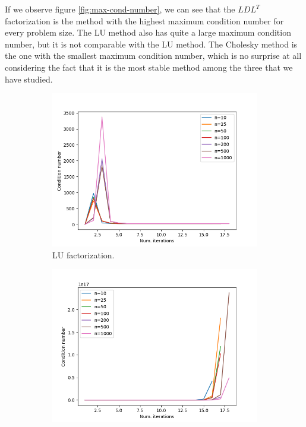 \documentclass[11pt,a4paper]{article}
\begin{document}
If we observe figure \ref{fig:max-cond-number}, we can see that the $LDL^T$ factorization
is the method with the highest maximum condition number for every problem size. The LU method
also has quite a large maximum condition number, but it is not comparable with the LU method.
The Cholesky method is the one with the smallest maximum condition number, which is no surprise at all
considering the fact that it is the most stable method among the three that we have studied.

\begin{figure}[H]
  \centering
  \begin{subfigure}[t]{0.5\textwidth}
    \centering
    \includegraphics[scale=0.45]{img/cond_num_iter_lu}
    \caption{LU factorization.}
  \end{subfigure}%
  \begin{subfigure}[t]{0.5\textwidth}
    \centering
    \includegraphics[scale=0.45]{img/cond_num_iter_ldl}

\end{subfigure}
\end{figure}
\end{document}
